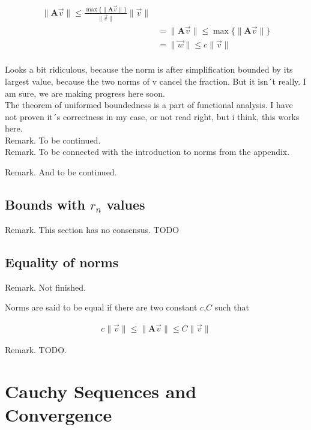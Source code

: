 \documentclass[a4paper]{article}
\begin{document}
\begin{displaymath}
\begin{align}
\|\boldsymbol{A}\vec{v}\| \leq \frac{\max\{\|\boldsymbol{A}\vec{v}\|\}}{\|\vec{v}\|}\|\vec{v}\| \\
&= \|\boldsymbol{A}\vec{v}\| \leq \max\{\|\boldsymbol{A}\vec{v}\|\}\\
&= \|\vec{w}\| \leq c\|\vec{v}\| \\
\end{align}
\end{displaymath}

Looks a bit ridiculous, because the norm is after simplification bounded by its largest value, because the two norms of v cancel the fraction. But it isn´t really. I am sure, we are making progress here soon.\\

The theorem of uniformed boundedness is a part of functional analysis. I have not proven it´s correctness in my case, or not read right, but i think, this works here.\\

Remark. To be continued.\\

Remark. To be connected with the introduction to norms from the appendix.

Remark. And to be continued.\\

\subsection{Bounds with $r_n$ values}

Remark. This section has no consensus. TODO

\subsection{Equality of norms}

Remark. Not finished.

Norms are said to be equal if there are two constant $c$,$C$ such that

\begin{displaymath}
\begin{align}
    c\|\vec{v}\| \leq \|\boldsymbol{A}\vec{v}\| \leq C\|\vec{v}\|
\end{align}
\end{displaymath}

Remark. TODO.

\section{Cauchy Sequences and Convergence}
\end{document}
